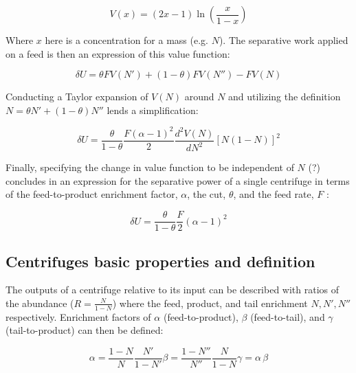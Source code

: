 \begin{equation}
    V(x) = (2x-1) \ln{(\frac{x}{1-x})}
\end{equation}

Where $x$ here is a concentration for a mass (e.g. $N$). The separative work applied on a feed is then an expression of this value function:

\begin{equation}
    \delta U = \theta F V(N') + (1-\theta) F V(N'') - F V(N)
\end{equation}

Conducting a Taylor expansion of $V(N)$ around $N$ and utilizing the definition $N=\theta N' + (1-\theta)N''$ lends a simplification:

\begin{equation}
    \delta U = \frac{\theta}{1-\theta} \frac{F(\alpha-1)^2}{2} \frac{d^2 V(N)}{dN^2} \left[ N(1-N) \right]^2
\end{equation}

Finally, specifying the change in value function to be independent of $N$ (?) concludes in an expression for the separative power of a single centrifuge
in terms of the feed-to-product enrichment factor, $\alpha$, the cut, $\theta$, and the feed rate, $F$ \cite{avery}:

\begin{equation} \label{eq_alpha_principle}
    \delta U = \frac{\theta}{1-\theta}\frac{F}{2}(\alpha-1)^{2}
\end{equation}

\subsection{Centrifuges basic properties and definition}

The outputs of a centrifuge relative to its input can be described with ratios
of the abundance ($R = \frac{N}{1-N}$) where the feed, product, and tail enrichment $N, N', N''$ respectively. Enrichment factors of $\alpha$ (feed-to-product),
$\beta$ (feed-to-tail), and $\gamma$ (tail-to-product) can then be defined:

\begin{subequations}
    \label{eq_alphabeta}
    \begin{equation} \label{eq_alpha_def}
        \alpha = \frac{1-N}{N}\frac{N'}{1-N'}
    \end{equation}
    \begin{equation}\label{eq_beta-def}
        \beta = \frac{1-N''}{N''}\frac{N}{1-N}
    \end{equation}
    \begin{equation}\label{eq_gamma-def}
        \gamma = \alpha \, \beta
    \end{equation}
\end{subequations}



